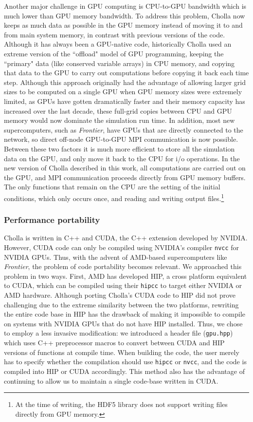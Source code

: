 \documentclass[modern]{aastex631}
\begin{document}
Another major challenge in GPU computing is CPU-to-GPU bandwidth which is much lower than GPU memory bandwidth. To address this problem, Cholla now keeps as much data as possible in the GPU memory instead of moving it to and from main system memory, in contrast with previous versions of the code. Although it has always been a GPU-native code, historically Cholla used an extreme version of the ``offload" model of GPU programming, keeping the ``primary" data (like conserved variable arrays) in CPU memory, and copying that data to the GPU to carry out computations before copying it back each time step. Although this approach originally had the advantage of allowing larger grid sizes to be computed on a single GPU when GPU memory sizes were extremely limited, as GPUs have gotten dramatically faster and their memory capacity has increased over the last decade, these full-grid copies between CPU and GPU memory would now dominate the simulation run time. In addition, most new supercomputers, such as \textit{Frontier}, have GPUs that are directly connected to the network, so direct off-node GPU-to-GPU MPI communication is now possible. Between these two factors it is much more efficient to store all the simulation data on the GPU, and only move it back to the CPU for i/o operations. In the new version of Cholla described in this work, all computations are carried out on the GPU, and  MPI communication proceeds directly from GPU memory buffers. The only functions that remain on the CPU are the setting of the initial conditions, which only occurs once, and reading and writing output files.\footnote{At the time of writing, the HDF5 library does not support writing files directly from GPU memory.}

\subsubsection{Performance portability}

Cholla is written in C++ and CUDA, the C++ extension developed by NVIDIA. However, CUDA code can only be compiled using NVIDIA's compiler \texttt{nvcc} for NVIDIA GPUs. Thus, with the advent of AMD-based supercomputers like \emph{Frontier}, the problem of code portability becomes relevant. We approached this problem in two ways. First, AMD has developed HIP, a cross platform equivalent to CUDA, which can be compiled using their \texttt{hipcc} to target either NVIDIA or AMD hardware. Although porting Cholla's CUDA code to HIP did not prove challenging due to the extreme similarity between the two platforms, rewriting the entire code base in HIP has the drawback of making it impossible to compile on systems with NVIDIA GPUs that do not have HIP installed. Thus, we chose to employ a less invasive modification: we introduced a header file (\texttt{gpu.hpp}) which uses C++ preprocessor macros to convert between CUDA and HIP versions of functions at compile time. When building the code, the user merely has to specify whether the compilation should use \texttt{hipcc} or \texttt{nvcc}, and the code is compiled into HIP or CUDA accordingly. This method also has the advantage of continuing to allow us to maintain a single code-base written in CUDA.
\end{document}
